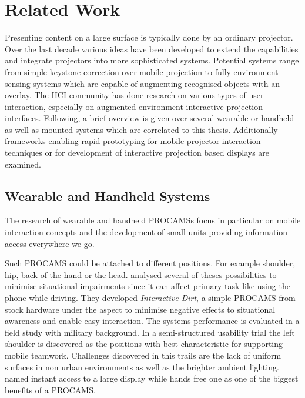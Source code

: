 \chapter{Related Work}\label{chapter:relatedWork}
Presenting content on a large surface is typically done by an ordinary projector. Over the last decade various ideas have been developed to extend the capabilities and integrate projectors into more sophisticated systems. Potential systems range from simple keystone correction over mobile projection to fully environment sensing systems which are capable of augmenting recognised objects with an overlay. The \ac{HCI} community has done research on various types of user interaction, especially on augmented environment interactive projection interfaces. Following, a brief overview is given over several wearable or handheld  as well as mounted systems which are correlated to this thesis. Additionally frameworks enabling rapid prototyping for mobile projector interaction techniques or for development of interactive projection based displays are examined. 

\section{Wearable and Handheld Systems}
The research of wearable and handheld \acfp{PROCAMS} focus in particular on mobile interaction concepts and the development of small units providing information access everywhere we go. 

Such PROCAMS could be attached to different positions. For example shoulder, hip, back of the hand or the head. \textcite{McFarlane:2009jz} analysed several of theses possibilities to minimise situational impairments since it can affect primary task like using the phone while driving. They developed \textit{Interactive Dirt}, a simple \ac{PROCAMS} from stock hardware under the aspect to minimise negative effects to situational awareness and enable easy interaction.  
The systems performance is evaluated in a field study with military background. In a semi-structured usability trial the left shoulder is discovered as the positions with best characteristic for supporting mobile teamwork. Challenges discovered in this trails are the lack of uniform surfaces in non urban environments as well as the brighter ambient lighting.~\citeauthor{McFarlane:2009jz} named instant access to a large display while hands free one as one of the biggest benefits of a \ac{PROCAMS}.  

